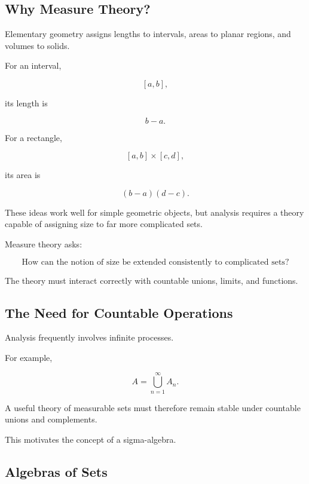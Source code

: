 \subsection{Why Measure Theory?}
\label{subsec:why-measure-theory}

Elementary geometry assigns lengths to intervals, areas to planar regions,
and volumes to solids.

For an interval,

\[
[a,b],
\]

its length is

\[
\boxed{
b-a.
}
\]

For a rectangle,

\[
[a,b]\times[c,d],
\]

its area is

\[
\boxed{
(b-a)(d-c).
}
\]

These ideas work well for simple geometric objects, but analysis requires
a theory capable of assigning size to far more complicated sets.

Measure theory asks:

\[
\boxed{
\text{How can the notion of size be extended consistently
to complicated sets?}
}
\]

The theory must interact correctly with countable unions, limits, and
functions.

\subsection{The Need for Countable Operations}
\label{subsec:countable-operations-measure}

Analysis frequently involves infinite processes.

For example,

\[
A=\bigcup_{n=1}^{\infty}A_n.
\]

A useful theory of measurable sets must therefore remain stable under
countable unions and complements.

This motivates the concept of a sigma-algebra.

\subsection{Algebras of Sets}
\label{subsec:algebras-of-sets}

